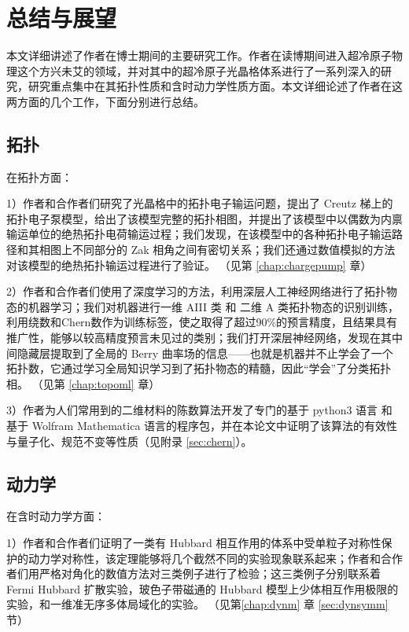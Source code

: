 \chapter{总结与展望}

本文详细讲述了作者在博士期间的主要研究工作。作者在读博期间进入超冷原子物理这个方兴未艾的领域，并对其中的超冷原子光晶格体系进行了一系列深入的研究，研究重点集中在其拓扑性质和含时动力学性质方面。本文详细论述了作者在这两方面的几个工作，下面分别进行总结。


\section{拓扑}

在拓扑方面：

1）作者和合作者们研究了光晶格中的拓扑电子输运问题，提出了 Creutz 梯上的拓扑电子泵模型，给出了该模型完整的拓扑相图，并提出了该模型中以偶数为内禀输运单位的绝热拓扑电荷输运过程；我们发现，在该模型中的各种拓扑电子输运路径和其相图上不同部分的 Zak 相角之间有密切关系；我们还通过数值模拟的方法对该模型的绝热拓扑输运过程进行了验证。
（见第 \ref{chap:chargepump} 章）

2）作者和合作者们使用了深度学习的方法，利用深层人工神经网络进行了拓扑物态的机器学习；我们对机器进行一维 AIII 类 和 二维 A 类拓扑物态的识别训练，利用绕数和Chern数作为训练标签，使之取得了超过90\%的预言精度，且结果具有推广性，能够以较高精度预言未见过的类别；我们打开深层神经网络，发现在其中间隐藏层提取到了全局的 Berry 曲率场的信息——也就是机器并不止学会了一个拓扑数，它通过学习全局知识学习到了拓扑物态的精髓，因此“学会”了分类拓扑相。
（见第 \ref{chap:topoml} 章）

3）作者为人们常用到的二维材料的陈数算法\cite{chern2005}开发了专门的基于 python3 语言 和 基于 Wolfram Mathematica 语言的程序包，并在本论文中证明了该算法的有效性与量子化、规范不变等性质（见附录 \ref{sec:chern}）。





\section{动力学}

在含时动力学方面：

1）作者和合作者们证明了一类有 Hubbard 相互作用的体系中受单粒子对称性保护的动力学对称性，该定理能够将几个截然不同的实验现象\cite{hubbard-expan-2010,hubbard-expan-2012,mbl1d,twobody-2017}联系起来；作者和合作者们用严格对角化的数值方法对三类例子进行了检验；这三类例子分别联系着 Fermi Hubbard 扩散实验，玻色子带磁通的 Hubbard 模型上少体相互作用极限的实验，和一维准无序多体局域化的实验。
（见第\ref{chap:dynm} 章 \ref{sec:dynsymm} 节）

